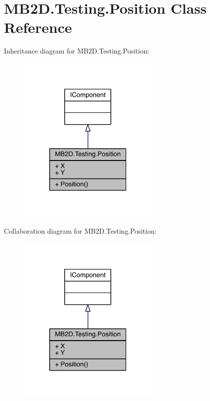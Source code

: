\hypertarget{class_m_b2_d_1_1_testing_1_1_position}{}\section{M\+B2\+D.\+Testing.\+Position Class Reference}
\label{class_m_b2_d_1_1_testing_1_1_position}


Inheritance diagram for M\+B2\+D.\+Testing.\+Position\+:\nopagebreak
\begin{figure}[H]
\begin{center}
\leavevmode
\includegraphics[width=197pt]{class_m_b2_d_1_1_testing_1_1_position__inherit__graph}
\end{center}
\end{figure}


Collaboration diagram for M\+B2\+D.\+Testing.\+Position\+:\nopagebreak
\begin{figure}[H]
\begin{center}
\leavevmode
\includegraphics[width=197pt]{class_m_b2_d_1_1_testing_1_1_position__coll__graph}
\end{center}
\end{figure}
